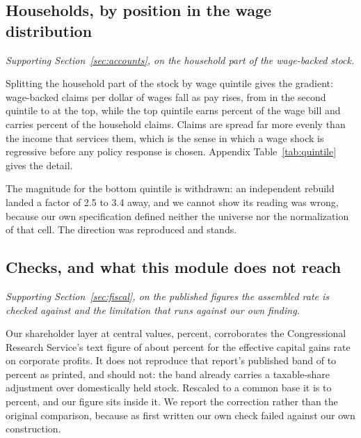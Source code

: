 \subsection{Households, by position in the wage distribution}

\emph{Supporting Section~\ref{sec:accounts}, on the household part of the wage-backed stock.}

Splitting the household part of the stock by wage quintile gives the gradient: wage-backed claims
per dollar of wages fall as pay rises, from  in the second quintile to
 at the top, while the top quintile earns  percent of
the wage bill and carries  percent of the household claims. Claims are
spread far more evenly than the income that services them, which is the sense in which a wage
shock is regressive before any policy response is chosen. Appendix Table~\ref{tab:quintile} gives
the detail.

The magnitude for the bottom quintile is withdrawn: an independent rebuild landed a factor of 2.5
to 3.4 away, and we cannot show its reading was wrong, because our own specification defined
neither the universe nor the normalization of that cell. The direction was reproduced and stands.

\subsection{Checks, and what this module does not reach}

\emph{Supporting Section~\ref{sec:fiscal}, on the published figures the assembled rate is checked against and the limitation that runs against our own finding.}

Our shareholder layer at central values,  percent, corroborates the
Congressional Research Service's text figure of about  percent for the
effective capital gains rate on corporate profits. It does not reproduce that report's published
band of  to  percent as printed, and should not: the band
already carries a taxable-share adjustment over domestically held stock. Rescaled to a common base
it is  to  percent, and our figure sits inside it.
We report the correction rather than the original comparison, because as first written our own
check failed against our own construction.

